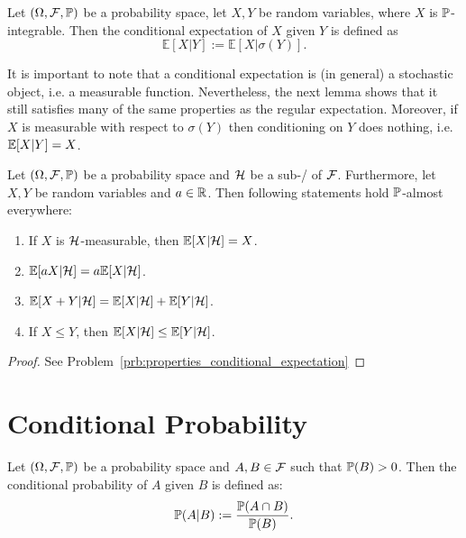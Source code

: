 \begin{definition}
Let $(\Omega, \mathcal F, \mathbb P)$ be a probability space, let $X,Y$ be random variables, where $X$ is $\mathbb P$-integrable. Then the conditional expectation of $X$ given $Y$ is defined as
\[
\mathbb{E}[X | Y] := \mathbb{E}[ X | \sigma(Y) ].
\]	
\end{definition}

It is important to note that a conditional expectation is (in general) a stochastic object, i.e. a measurable function. Nevertheless, the next lemma shows that it still satisfies many of the same properties as the regular expectation. Moreover, if $X$ is measurable with respect to $\sigma(Y)$ then conditioning on $Y$ does nothing, i.e. $\mathbb E[X|Y] = X$.

\begin{lemma}\label{lem:properties_conditional_expectation}
Let $(\Omega, \mathcal F, \mathbb P)$ be a probability space and $\mathcal H$ be a sub-\sigalg/ of $\mathcal F$. Furthermore, let $X, Y$ be random variables and $a \in \mathbb R$. Then following statements hold $\mathbb P$-almost everywhere:
\begin{enumerate}[label={(\alph*)}]
\item If $X$ is $\mathcal H$-measurable, then $\mathbb E[X | \mathcal H] = X$.
\item $\mathbb E[a X | \mathcal H] = a \mathbb E[X | \mathcal H]$.
\item $\mathbb E[X + Y | \mathcal H] = \mathbb E[X | \mathcal H] + \mathbb E[Y | \mathcal H]$.
\item If $X \le Y$, then $\mathbb E[X | \mathcal H] \le \mathbb E[Y | \mathcal H]$.
\end{enumerate}
\end{lemma}

\begin{proof}
See Problem~\ref{prb:properties_conditional_expectation}
\end{proof}

\section{Conditional Probability}

\begin{definition}\label{def:conditional_prop_events}
Let $(\Omega, \mathcal F, \mathbb P)$ be a probability space and $A, B \in \mathcal F$ such that $\mathbb P(B) > 0$. Then the conditional probability of $A$ given $B$ is defined as:
\[
	\mathbb P(A|B) := \frac{\mathbb P(A \cap B)}{\mathbb P(B)}.
\]
\end{definition}



